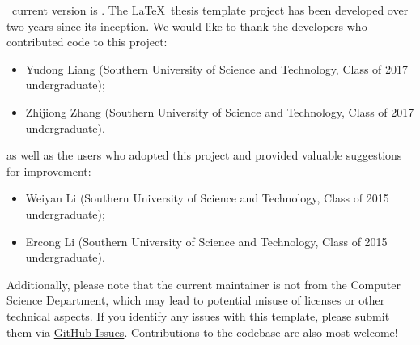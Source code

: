 \sustechthesis\ current version is \version. The \LaTeX\ thesis template project has been developed over two years since its inception. We would like to thank the developers who contributed code to this project:
\begin{itemize}
    \item Yudong Liang (Southern University of Science and Technology, Class of 2017 undergraduate);
    \item Zhijiong Zhang (Southern University of Science and Technology, Class of 2017 undergraduate).
\end{itemize}
as well as the users who adopted this project and provided valuable suggestions for improvement:
\begin{itemize}
    \item Weiyan Li (Southern University of Science and Technology, Class of 2015 undergraduate);
    \item Ercong Li (Southern University of Science and Technology, Class of 2015 undergraduate).
\end{itemize}

Additionally, please note that the current maintainer is not from the Computer Science Department, which may lead to potential misuse of licenses or other technical aspects. If you identify any issues with this template, please submit them via \href{https://github.com/Iydon/sustechthesis/issues}{GitHub Issues}. Contributions to the codebase are also most welcome!